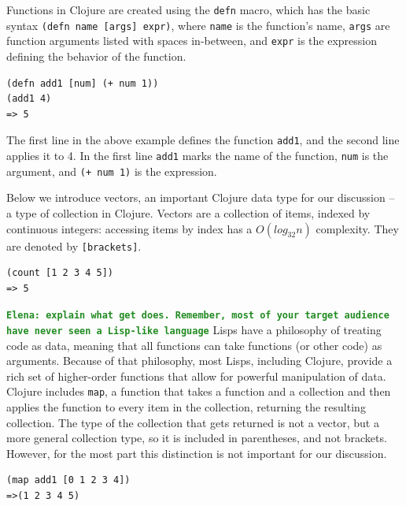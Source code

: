 \documentclass[12pt]{article}
\newcommand{\comment}[1]{{\bf \tt  {#1}}}
\newcommand{\emcomment}[1]{\textcolor{ForestGreen}{\comment{Elena: {#1}}}}
\newcommand{\clocode}[1]{{\texttt {#1}}}
\begin{document}
Functions in Clojure are created using the \clocode{defn} macro, which has the basic syntax \clocode{(defn name [args] expr)}, where \clocode{name} is the function's name, \clocode{args} are function arguments listed with spaces in-between, and \clocode{expr} is the expression defining the behavior of the function. 
\begin{verbatim}
(defn add1 [num] (+ num 1))
(add1 4)
=> 5
\end{verbatim} 
The first line in the above example defines the function \clocode{add1}, and the second line applies it to 4. In the first line \clocode{add1} marks the name of the function, \clocode{num} is the argument, and \clocode{(+ num 1)} is the expression.

Below we introduce vectors, an important Clojure data type for our discussion -- a type of collection in Clojure. Vectors are a collection of items, indexed by continuous integers: accessing items by index has a $O(log_{32}n)$  complexity. They are denoted by 
\clocode{[brackets]}.
\begin{verbatim}
(count [1 2 3 4 5])
=> 5
\end{verbatim}
\emcomment{explain what get does. Remember, most of your target audience have never seen a Lisp-like language}
Lisps have a philosophy of treating code as data, meaning that all functions can take functions (or other code) as arguments. Because of that philosophy, most Lisps, including Clojure, provide a rich set of higher-order functions that allow for powerful manipulation of data. Clojure includes \clocode{map}, a function that takes a function and a collection and then applies the function to every item in the collection, returning the resulting collection. The type of the collection that gets returned is not a vector, but a more general collection type, so it is included in parentheses, and not brackets. However, for the most part this distinction is not important for our discussion. 
\begin{verbatim}
(map add1 [0 1 2 3 4])
=>(1 2 3 4 5)
\end{verbatim}
\end{document}
